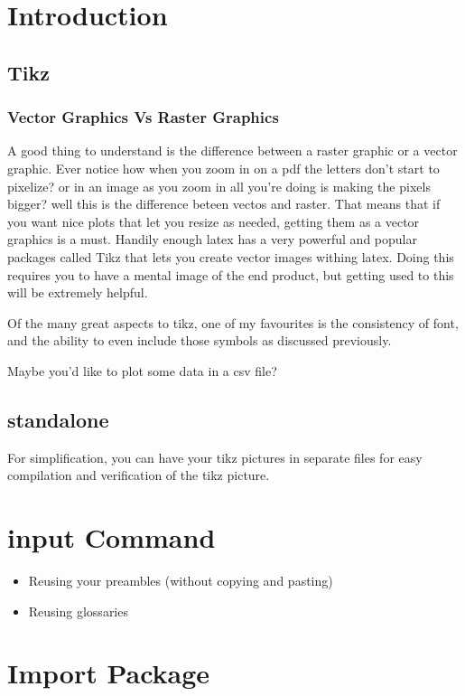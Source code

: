 \documentclass[hidelinks, float=false, crop=false]{standalone}
\begin{document}
{}
    \section{Introduction}
        \subsection{Tikz}
            \subsubsection{Vector Graphics Vs Raster Graphics}
                A good thing to understand is the difference between a raster graphic or a vector graphic. Ever notice how when you zoom in on a pdf the letters don't start to pixelize? or in an image as you zoom in all you're doing is making the pixels bigger? well this is the difference beteen vectos and raster. That means that if you want nice plots that let you resize as needed, getting them as a vector graphics is a must. Handily enough latex has a very powerful and popular packages called Tikz that lets you create vector images withing latex. Doing this requires you to have a mental image of the end product, but getting used to this will be extremely helpful.

                Of the many great aspects to tikz, one of my favourites is the consistency of font, and the ability to even include those symbols as discussed previously.


                Maybe you'd like to plot some data in a csv file?

        \subsection{standalone}
            For simplification, you can have your tikz pictures in separate files for easy compilation and verification of the tikz picture.

    \section{input Command}
        \begin{itemize}
            \item Reusing your preambles (without copying and pasting)
            \item Reusing glossaries
        \end{itemize}
    \section{Import Package}
\end{document}
